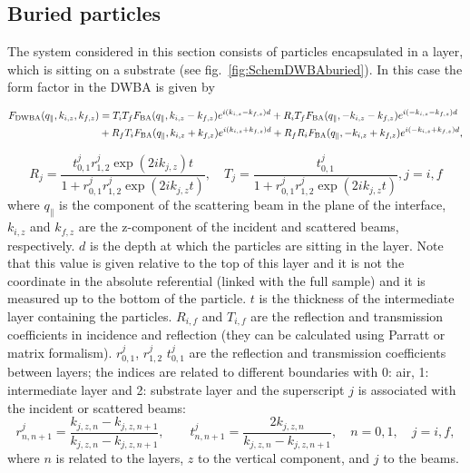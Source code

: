 \subsection{Buried particles} 

The system considered in this section consists of particles encapsulated in a layer, which is sitting on a substrate (see fig.~\ref{fig:SchemDWBAburied}). In this case the form factor in the DWBA is given by

\begin{align}
F_{\rm{DWBA}}(q_{\parallel}, k_{i,z}, k_{f,z}) &= T_i T_f F_{\rm{BA}}(q_{\parallel}, k_{i,z}-k_{f,z})e^{i(k_{i,z}-k_{f,z})d}+ R_i T_f F_{\rm{BA}}(q_{\parallel}, -k_{i,z}-k_{f,z})e^{i(-k_{i,z}-k_{f,z})d} \nonumber \\
&+ R_f T_i F_{\rm{BA}}(q_{\parallel}, k_{i,z}+k_{f,z}) e^{i(k_{i,z}+k_{f,z})d}+ R_f R_iF_{\rm{BA}}(q_{\parallel},-k_{i,z}+k_{f,z})e^{i(-k_{i,z}+k_{f,z})d}, \label{eq:dwbaburied}
\end{align}

\begin{equation*}
R_j =\frac{t^{j}_{0,1}r^{j}_{1,2}\exp(2ik_{j,z})t}{1+r^{j}_{0,1}r^{j}_{1,2}\exp(2ik_{j,z}t)}, \quad T_j=\frac{t^{j}_{0,1}}{1+r^{j}_{0,1}r^{j}_{1,2}\exp(2ik_{j,z}t)}, j=i,f 
\end{equation*}
where $q_{\parallel}$ is the component of the scattering beam in the plane of the interface, $k_{i,z}$ and $k_{f,z}$ are the z-component of the incident and scattered beams, respectively.  $d$ is the depth at which the particles are sitting in the layer. Note that this value is given relative to the top of this layer and it is not the coordinate in the absolute referential (linked with the full sample) and it is measured up to the bottom of the particle. $t$ is the thickness of the intermediate layer containing the particles. $R_{i,f}$ and $T_{i,f}$  are the reflection  and transmission coefficients in incidence and reflection (they can be calculated using Parratt or matrix formalism). $r^j_{0,1}$, $r^j_{1,2}$ $t^j_{0,1}$ are the reflection and transmission coefficients between layers; the indices are related to different boundaries with 0: air, 1: intermediate layer and 2: substrate layer and the superscript $j$ is associated with the incident or scattered beams:
\begin{equation*}
r^j_{n,n+1}=\frac{k_{j,z,n}-k_{j,z,n+1}}{k_{j,z,n}-k_{j,z,n+1}}, \qquad t^j_{n,n+1}= \frac{2k_{j,z,n}}{k_{j,z,n}-k_{j,z,n+1}}, \quad n=0,1, \quad j=i,f,
\end{equation*}
where $n$ is related to the layers, $z$ to the vertical component, and $j$ to the beams.

